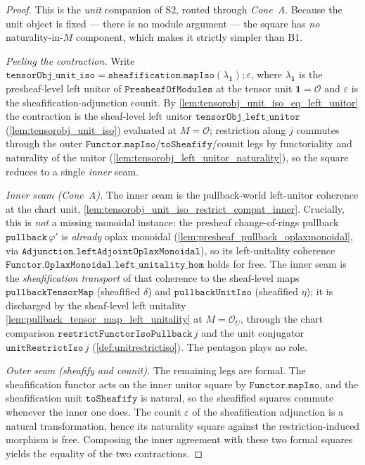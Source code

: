 \begin{proof}
  This is the \emph{unit} companion of S2, routed through \emph{Cone~A}. Because the unit object is
  fixed --- there is no module argument --- the square has \emph{no} naturality-in-\(M\) component,
  which makes it strictly simpler than B1.

  \emph{Peeling the contraction.} Write
  \(\mathtt{tensorObj\_unit\_iso} = \mathtt{sheafification.mapIso}(\lambda_{\mathbf 1})
  \mathbin{;} \varepsilon\), where \(\lambda_{\mathbf 1}\) is the presheaf-level left unitor of
  \(\mathtt{PresheafOfModules}\) at the tensor unit \(\mathbf 1 = \mathcal{O}\) and \(\varepsilon\) is
  the sheafification-adjunction counit. By \cref{lem:tensorobj_unit_iso_eq_left_unitor} the
  contraction is the sheaf-level left unitor \(\mathtt{tensorObj\_left\_unitor}\)
  (\cref{lem:tensorobj_unit_iso}) evaluated at \(M = \mathcal{O}\); restriction along \(j\) commutes
  through the outer \(\mathtt{Functor.mapIso}\)/\(\mathtt{toSheafify}\)/counit legs by functoriality
  and naturality of the unitor (\cref{lem:tensorobj_left_unitor_naturality}), so the square reduces to
  a single \emph{inner} seam.

  \emph{Inner seam (Cone~A).} The inner seam is the pullback-world left-unitor coherence at the chart
  unit, \cref{lem:tensorobj_unit_iso_restrict_compat_inner}. Crucially, this is \emph{not} a missing
  monoidal instance: the presheaf change-of-rings pullback \(\mathtt{pullback}\,\varphi'\) is
  \emph{already} oplax monoidal (\cref{lem:presheaf_pullback_oplaxmonoidal}, via
  \(\mathtt{Adjunction.leftAdjointOplaxMonoidal}\)), so its left-unitality coherence
  \(\mathtt{Functor.OplaxMonoidal.left\_unitality\_hom}\) holds for free. The inner seam is the
  \emph{sheafification transport} of that coherence to the sheaf-level maps
  \(\mathtt{pullbackTensorMap}\) (sheafified \(\delta\)) and \(\mathtt{pullbackUnitIso}\) (sheafified
  \(\eta\)); it is discharged by the sheaf-level left unitality
  \cref{lem:pullback_tensor_map_left_unitality} at \(M = \mathcal{O}_U\), through the chart comparison
  \(\mathtt{restrictFunctorIsoPullback}\,j\) and the unit conjugator \(\mathtt{unitRestrictIso}\,j\)
  (\cref{def:unitrestrictiso}). The pentagon plays no role.

  \emph{Outer seam (sheafify and counit).} The remaining legs are formal. The sheafification functor
  acts on the inner unitor square by \(\mathtt{Functor.mapIso}\), and the sheafification unit
  \(\mathtt{toSheafify}\) is natural, so the sheafified squares commute whenever the inner one does.
  The counit \(\varepsilon\) of the sheafification adjunction is a natural transformation, hence its
  naturality square against the restriction-induced morphism is free. Composing the inner agreement
  with these two formal squares yields the equality of the two contractions.


\end{proof}
